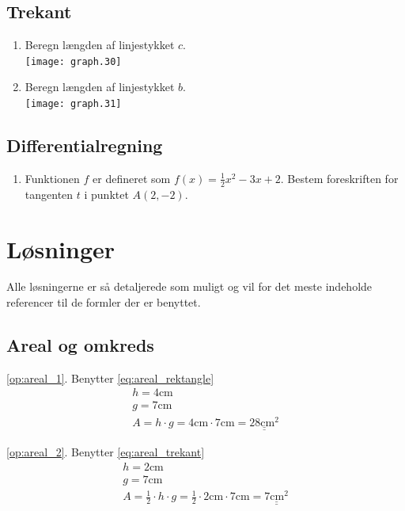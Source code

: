 \documentclass[11pt,a5paper,fleqn,leqno]{book}
\begin{document}
\section{Trekant}

\begin{enumerate}
\item \label{op:trekant_1}
Beregn længden af linjestykket $c$. \\
\texttt{[image: graph.30]}
\item \label{op:trekant_2}
Beregn længden af linjestykket $b$. \\
\texttt{[image: graph.31]}
\end{enumerate}

\section{Differentialregning}

\begin{enumerate}
\item \label{op:diff_1} Funktionen $f$ er defineret som $f(x) = \frac{1}{2}x^2 - 3x + 2$. Bestem foreskriften for tangenten $t$ i punktet $A(2,-2)$.
\end{enumerate}

\chapter{Løsninger} \label{ch:Loesninger}

Alle løsningerne er så detaljerede som muligt og vil for det meste indeholde referencer til de formler der er benyttet.

\newpage

\section{Areal og omkreds}

\ref{op:areal_1}. Benytter \eqref{eq:areal_rektangle}
\begin{displaymath}\begin{array}{l}
h = 4\text{cm}\\
g = 7\text{cm}\\
A = h \cdot g = 4\text{cm} \cdot 7\text{cm} = \underline{\underline{28\text{cm}^2}}
\end{array}\end{displaymath}

\ref{op:areal_2}. Benytter \eqref{eq:areal_trekant}
\begin{displaymath}\begin{array}{l}
h = 2\text{cm}\\
g = 7\text{cm}\\
A = \frac{1}{2} \cdot h \cdot g = \frac{1}{2} \cdot 2\text{cm} \cdot 7\text{cm} = \underline{\underline{7\text{cm}^2}}
\end{array}\end{displaymath}
\end{document}
